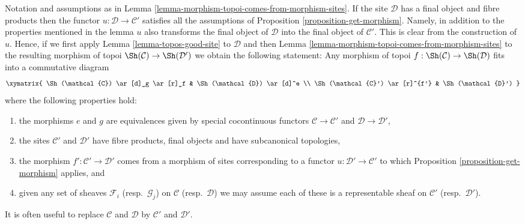 \begin{remark}
\label{remark-morphism-topoi-comes-from-morphism-sites}
Notation and assumptions
as in Lemma \ref{lemma-morphism-topoi-comes-from-morphism-sites}.
If the site $\mathcal{D}$ has a final object and fibre products
then the functor $u : \mathcal{D} \to \mathcal{C}'$ satisfies
all the assumptions of Proposition \ref{proposition-get-morphism}.
Namely, in addition to the properties mentioned in the lemma $u$
also transforms the final object of $\mathcal{D}$ into the final
object of $\mathcal{C}'$. This is clear from the construction of $u$.
Hence, if we first apply
Lemma \ref{lemma-topos-good-site}
to $\mathcal{D}$
and then
Lemma \ref{lemma-morphism-topoi-comes-from-morphism-sites}
to the resulting morphism of topoi
$\Sh(\mathcal{C}) \to \Sh(\mathcal{D}')$
we obtain the following statement:
Any morphism of topoi
$f : \Sh(\mathcal{C}) \to \Sh(\mathcal{D})$
fits into a commutative diagram
$$
\xymatrix{
\Sh(\mathcal{C}) \ar[d]_g \ar[r]_f &
\Sh(\mathcal{D}) \ar[d]^e \\
\Sh(\mathcal{C}') \ar[r]^{f'} &
\Sh(\mathcal{D}')
}
$$
where the following properties hold:
\begin{enumerate}
\item the morphisms $e$ and $g$ are equivalences given by
special cocontinuous functors $\mathcal{C} \to \mathcal{C}'$ and
$\mathcal{D} \to \mathcal{D}'$,
\item the sites $\mathcal{C}'$ and $\mathcal{D}'$ have fibre products, final
objects and have subcanonical topologies,
\item the morphism $f' : \mathcal{C}' \to \mathcal{D}'$ comes from a
morphism of sites corresponding to a functor
$u : \mathcal{D}' \to \mathcal{C}'$ to which
Proposition \ref{proposition-get-morphism}
applies, and
\item given any set of sheaves $\mathcal{F}_i$ (resp.\ $\mathcal{G}_j$)
on $\mathcal{C}$ (resp.\ $\mathcal{D}$) we may assume each of these is
a representable sheaf on $\mathcal{C}'$ (resp.\ $\mathcal{D}'$).
\end{enumerate}
It is often useful to replace $\mathcal{C}$ and $\mathcal{D}$ by
$\mathcal{C}'$ and $\mathcal{D}'$.
\end{remark}

